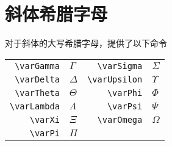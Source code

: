 \documentclass[openany]{ctexbook}
\begin{document}
\section{斜体希腊字母}
对于斜体的大写希腊字母，提供了以下命令
\begin{center}
\begin{tabular}{rlrl}
\verb|\varGamma|&$\varGamma$&\verb|\varSigma|&$\varSigma$\\
\verb|\varDelta|&$\varDelta$&\verb|\varUpsilon|&$\varUpsilon$\\
\verb|\varTheta|&$\varTheta$&\verb|\varPhi|&$\varPhi$\\
\verb|\varLambda|&$\varLambda$&\verb|\varPsi|&$\varPsi$\\
\verb|\varXi|&$\varXi$&\verb|\varOmega|&$\varOmega$\\
\verb|\varPi|&$\varPi$&&
\end{tabular}
\end{center}
\end{document}
